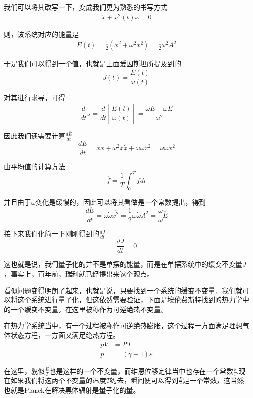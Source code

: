 \documentclass{article}
\begin{document}
我们可以将其改写一下，变成我们更为熟悉的书写方式
\begin{align*}
	\ddot{x}+\omega^2(t)x=0
\end{align*}

则，该系统对应的能量是
\begin{align*}
	E(t) = \frac{1}{2}(\dot{x}^2+\omega^2x^2)=\frac{1}{2}\omega^2A^2
\end{align*}

于是我们可以得到一个值，也就是上面爱因斯坦所提及到的
\[J(t) = \frac{\overline{E}(t)}{\omega(t)}\]

对其进行求导，可得
\begin{equation*}
	\frac{d}{dt}J = \frac{d}{dt}\left[\frac{\overline{E}(t)}{\omega(t)}\right]=\frac{\omega\dot{\overline{E}}-\dot{\omega}\overline{E}}{\omega^2}
\end{equation*}

因此我们还需要计算$\displaystyle \frac{d\overline{E}}{dt}$
\[\frac{dE}{dt}=\dot{x}\ddot{x}+\omega^2x\dot{x}+\omega\dot{\omega}x^2=\omega\dot{\omega}x^2\]

由平均值的计算方法
\[\overline{f}=\frac{1}{T}\int_0^T fdt\]

并且由于$\omega$变化是缓慢的，因此可以将其看做是一个常数提出，得到
\[\frac{d\overline{E}}{dt}=\omega\dot{\omega}\overline{x^2}=\frac{1}{2}\omega\dot{\omega}A^2=\frac{\dot{\omega}}{\omega}\overline{E}\]

接下来我们化简一下刚刚得到的$\displaystyle \frac{dJ}{dt}$
\[\frac{dJ}{dt}=0\]

这也就是说，我们量子化的并不是单摆的能量，而是在单摆系统中的缓变不变量$J$，事实上，百年前，瑞利就已经提出来这个观点。

看似问题变得明朗了起来，也就是说，只要找到一个系统的缓变不变量，我们就可以将这个系统进行量子化，但这依然需要验证，下面是埃伦费斯特找到的热力学中的一个缓变不变量，在这里被称作为可逆绝热不变量。

在热力学系统当中，有一个过程被称作可逆绝热膨胀，这个过程一方面满足理想气体状态方程，一方面又满足绝热方程。
\begin{align*}
	pV & = RT                    \\
	p  & = (\gamma-1)\varepsilon
\end{align*}

在这里，貌似$\displaystyle \frac{E}{T}$也是这样的一个不变量，而维恩位移定律当中也存在一个常数$\displaystyle \frac{\nu}{T}$,现在如果我们将这两个不变量的温度$T$约去，瞬间便可以得到$\displaystyle\frac{E}{\nu}$是一个常数，这当然也就是Planck在解决黑体辐射是量子化的量。
\end{document}
